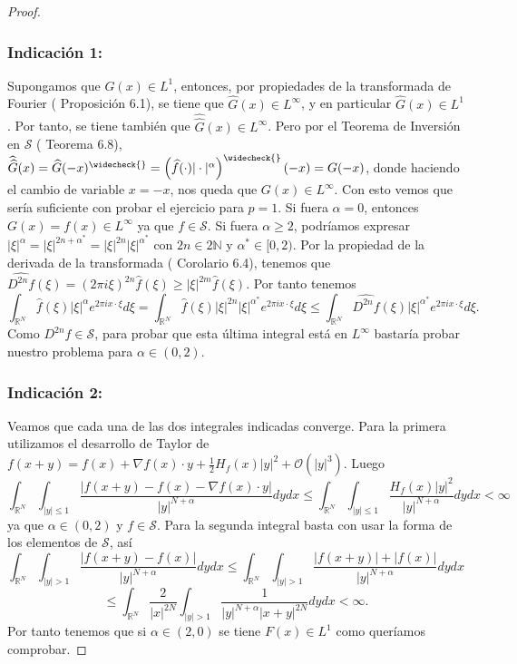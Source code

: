 \documentclass[11pt,a4paper]{article}
\begin{document}
\begin{proof}
    \
    \subsubsection*{Indicación 1:}
    Supongamos que $ G(x) \in L^1$, entonces, por propiedades de la transformada de Fourier (\cite{Soria} Proposición 6.1), se tiene que $ \widehat G(x) \in L^\infty $, y en particular $ \widehat G(x) \in L^1$. Por tanto, se tiene también que $ \widehat{\widehat G}(x) \in L^\infty$. Pero por el Teorema de Inversión en $\mathscr{S}$ (\cite{Soria} Teorema 6.8), $ \widehat{\widehat G} (x) = \widehat G(-x)^{\widecheck{}} = \left(\widehat f(\cdot)|\cdot|^\alpha\right)^{\widecheck{}}(-x) = G(-x)$, donde haciendo el cambio de variable $ x = -x $, nos queda que $ G(x) \in L^\infty $. Con esto vemos que sería suficiente con probar el ejercicio para $ p = 1 $.
    \vskip 5mm
    Si fuera $ \alpha = 0 $, entonces $ G(x) = f(x) \in L^\infty $ ya que $ f \in \mathscr S$. Si fuera $ \alpha \ge 2 $, podríamos expresar $ |\xi|^\alpha = |\xi|^{2n + \alpha^*} = |\xi|^{2n} |\xi|^{\alpha^*}$ con $ 2n \in 2\mathbb N $ y $\alpha^* \in [0, 2)$. Por la propiedad de la derivada de la transformada (\cite{Soria} Corolario 6.4), tenemos que $ \widehat{D^{2n}f}(\xi) = (2 \pi i \xi)^{2n} \widehat f (\xi) \ge |\xi|^{2m} \widehat f (\xi)$. Por tanto tenemos
    $$
    \int_{\mathbb R^N}
    \widehat f(\xi)|\xi|^\alpha e^{2\pi ix\cdot\xi}d\xi = \int_{\mathbb R^N}
    \widehat f(\xi) |\xi|^{2n} |\xi|^{\alpha^*} e^{2\pi ix\cdot\xi}d\xi \le \int_{\mathbb R^N}
    \widehat{D^{2n}f}(\xi) |\xi|^{\alpha^*} e^{2\pi ix\cdot\xi}d\xi.
    $$
    Como $ D^{2n}f \in \mathscr S $, para probar que esta última integral está en $ L^\infty $ bastaría probar nuestro problema para $ \alpha \in (0, 2)$. 

    \newpage

    \subsubsection*{Indicación 2:}
    Veamos que cada una de las dos integrales indicadas converge. Para la primera utilizamos el desarrollo de Taylor de $ f(x + y) = f(x) + \nabla f(x) \cdot y + \frac{1}{2}H_f(x) |y|^2 + \mathcal O (|y|^3)$. Luego
    $$
    \int_{\mathbb R^N}\int_{|y|\le 1}\frac{|f(x+y)-f(x)-\nabla f(x)\cdot y|}{|y|^{N+\alpha}}dy dx \le
    \int_{\mathbb R^N}\int_{|y|\le 1}\frac{H_f(x) |y|^2}{|y|^{N+\alpha}}dy dx < \infty
    $$
    ya que $ \alpha \in (0, 2) $ y $ f \in \mathscr S $. Para la segunda integral basta con usar la forma de los elementos de $ \mathscr S $, así
    $$
    \int_{\mathbb R^N}\int_{|y|>1}\frac{|f(x+y)-f(x)|}{|y|^{N+\alpha}}dydx \le \int_{\mathbb R^N}\int_{|y|>1}\frac{|f(x+y)|+|f(x)|}{|y|^{N+\alpha}}dydx 
    $$
    $$
    \le \int_{\mathbb R^N} \frac{2}{|x|^{2N}}\int_{|y|>1}\frac{1}{|y|^{N+\alpha}|x+y|^{2N}}dydx < \infty.
    $$
    Por tanto tenemos que si $\alpha \in (2, 0)$ se tiene $F(x) \in L^1$ como queríamos comprobar.

\end{proof}
\end{document}
